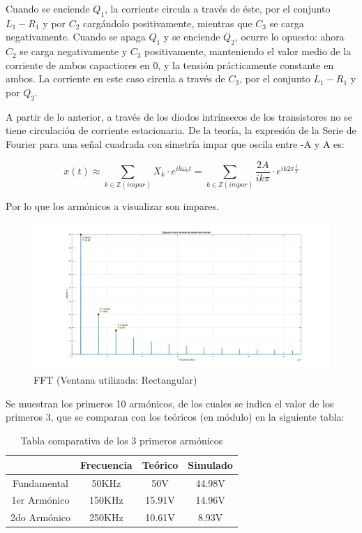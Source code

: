 \documentclass[e4_tp3_main.tex]{subfiles}
\begin{document}
Cuando se enciende $Q_1$, la corriente circula a través de éste, por el conjunto $L_1 - R_1$ y por $C_2$ cargándolo positivamente, mientras que $C_3$ se carga negativamente. Cuando se apaga $Q_1$ y se enciende $Q_2$, ocurre lo opuesto: ahora $C_2$ se carga negativamente y $C_3$ positivamente, manteniendo el valor medio de la corriente de ambos capactiores en 0, y la tensión prácticamente constante en ambos. La corriente en este caso circula a través de $C_3$, por el conjunto $L_1 - R_1$ y por $Q_2$.\par
A partir de lo anterior, a través de los diodos intrínsecos de los transistores no se tiene circulación de corriente estacionaria.
\newpage
De la teoría, la expresión de la Serie de Fourier para una señal cuadrada con simetría impar que oscila entre -A y A es:

\[
x(t) \approx \sum_{k \in \mathbb Z (impar)}^{}X_k \cdot e^{ik\omega_0 t} = \sum_{k \in \mathbb Z (impar)}^{} \frac{2A}{ik\pi} \cdot e^{ik2\pi \frac{t}{T}} 
\]

Por lo que los armónicos a visualizar son impares.

\begin{figure}[H]
\centering
\includegraphics[width=1\linewidth]{Imagenes/fft.png}
\caption{FFT (Ventana utilizada: Rectangular)}
\end{figure}

Se muestran los primeros 10 armónicos, de los cuales se indica el valor de los primeros 3, que se comparan con los teóricos (en módulo) en la siguiente tabla:

\begin{table}[ht]
\centering
\begin{tabular}{|c|c|c|c|}
\hline
             & Frecuencia & Teórico & Simulado \\ \hline
Fundamental  & 50KHz      & 50V     & 44.98V   \\ \hline
1er Armónico & 150KHz     & 15.91V  & 14.96V   \\ \hline
2do Armónico & 250KHz     & 10.61V  & 8.93V    \\ \hline
\end{tabular}
\caption{Tabla comparativa de los 3 primeros armónicos}
\end{table}
\end{document}
